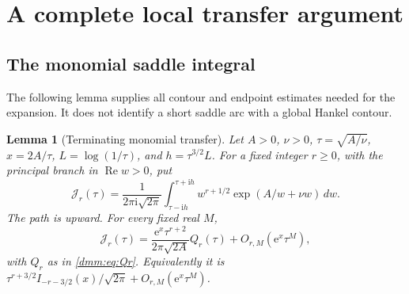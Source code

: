 \documentclass[11pt,letterpaper]{article}
\numberwithin{equation}{section}
\newtheorem{lemma}[theorem]{Lemma}
\theoremstyle{definition}\newtheorem{definition}[theorem]{Definition}
\theoremstyle{remark}\newtheorem{remark}[theorem]{Remark}
\newcommand{\ii}{\mathrm i}
\newcommand{\ee}{\mathrm e}
\DeclareMathOperator{\Rea}{Re}
\begin{document}
\section{A complete local transfer argument}\label{dmm:sec:transfer}
\subsection{The monomial saddle integral}
The following lemma supplies all contour and endpoint estimates needed for the expansion. It does not identify a short saddle arc with a global Hankel contour.

\begin{lemma}[Terminating monomial transfer]\label{dmm:lem:transfer}
Let $A>0$, $\nu>0$, $\tau=\sqrt{A/\nu}$, $x=2A/\tau$, $L=\log(1/\tau)$, and $h=\tau^{3/2}L$. For a fixed integer $r\ge0$, with the principal branch in $\Rea w>0$, put
\begin{equation}\label{dmm:eq:Jr}
\mathcal J_r(\tau)=\frac1{2\pi\ii\sqrt{2\pi}}
\int_{\tau-\ii h}^{\tau+\ii h}
w^{r+1/2}\exp(A/w+\nu w)\,dw.
\end{equation}
The path is upward. For every fixed real $M$,
\begin{equation}\label{dmm:eq:Jpoly}
\mathcal J_r(\tau)=\frac{\ee^x\tau^{r+2}}{2\pi\sqrt{2A}}Q_r(\tau)
+O_{r,M}(\ee^x\tau^M),
\end{equation}
with $Q_r$ as in \eqref{dmm:eq:Qr}. Equivalently it is
$\tau^{r+3/2}I_{-r-3/2}(x)/\sqrt{2\pi}+O_{r,M}(\ee^x\tau^M)$.
\end{lemma}
\end{document}
